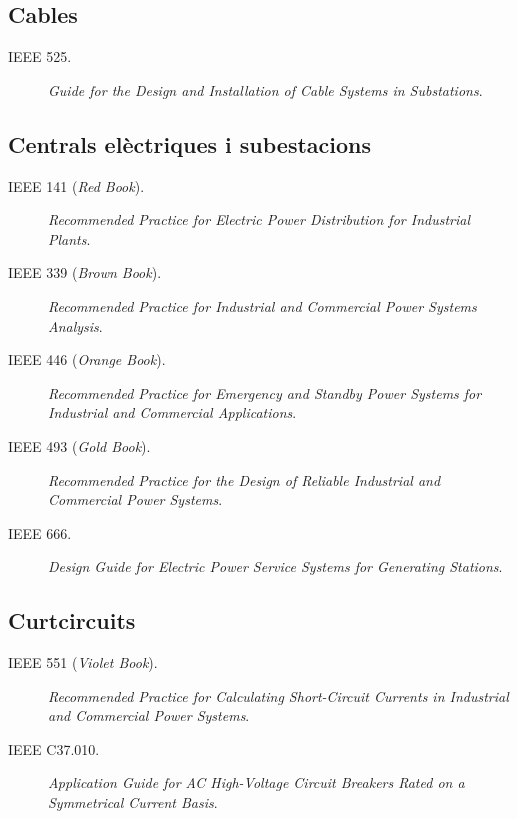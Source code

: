 \subsection*{Cables}
\begin{description}
	\item [\hspace{5mm}IEEE 525.] \textit{Guide for the Design and Installation of Cable Systems in Substations}.
\end{description}

\subsection*{Centrals elèctriques i subestacions}
\begin{description}
	\item [\hspace{5mm}IEEE 141 (\textit{Red Book}).] \textit{Recommended Practice for Electric Power Distribution for Industrial Plants}.
	\item [\hspace{5mm}IEEE 339 (\textit{Brown Book}).] \textit{Recommended Practice for Industrial and Commercial Power Systems Analysis}.
	\item [\hspace{5mm}IEEE 446 (\textit{Orange Book}).] \textit{Recommended Practice for Emergency and Standby Power Systems for Industrial and Commercial Applications}.
	\item [\hspace{5mm}IEEE 493 (\textit{Gold Book}).] \textit{Recommended Practice for the Design of Reliable Industrial and Commercial Power Systems}. 
	\item [\hspace{5mm}IEEE 666.] \textit{Design Guide for Electric Power Service Systems for Generating Stations}.
\end{description}



\subsection*{Curtcircuits}
\begin{description}
	\item [\hspace{5mm}IEEE 551 (\textit{Violet Book}).] \textit{Recommended Practice for Calculating Short-Circuit Currents in Industrial and Commercial Power Systems}.
	\item [\hspace{5mm}IEEE C37.010.] \textit{Application Guide for AC High-Voltage Circuit Breakers Rated on a Symmetrical Current Basis}.
\end{description}

